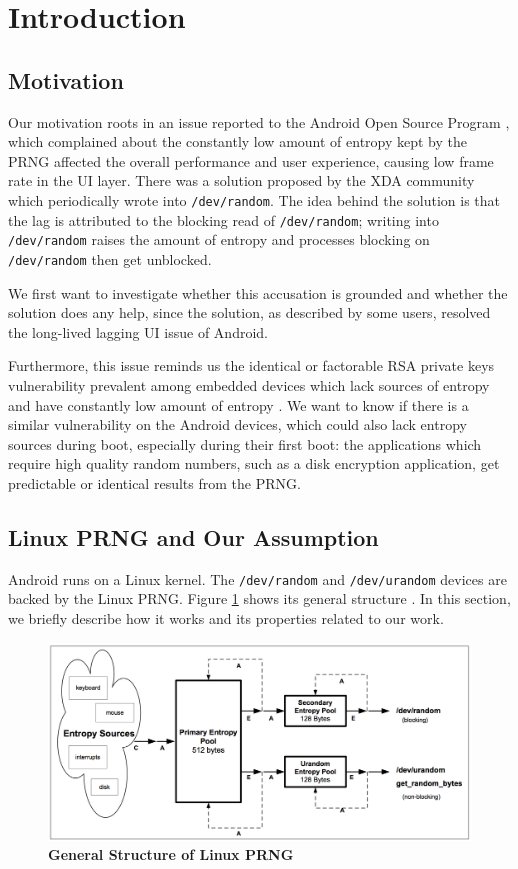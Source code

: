\section{Introduction}
\subsection{Motivation}

Our motivation roots in an issue reported to the Android Open Source Program \cite{issue42265} , which complained about the constantly low amount of entropy kept by the PRNG affected the overall performance and user experience, causing low frame rate in the UI layer. There was a solution proposed by the XDA community which periodically wrote into \verb|/dev/random|. The idea behind the solution is that the lag is attributed to the blocking read of \verb|/dev/random|; writing into \verb|/dev/random| raises the amount of entropy and processes blocking on \verb|/dev/random| then get unblocked. 

We first want to investigate whether this accusation is grounded and whether the solution does any help, since the solution, as described by some users, resolved the long-lived lagging UI issue of Android.

Furthermore, this issue reminds us the identical or factorable RSA private keys vulnerability prevalent among embedded devices which lack sources of entropy and have constantly low amount of entropy \cite{weakkeys12}. We want to know if there is a similar vulnerability on the Android devices, which could also lack entropy sources during boot, especially during their first boot: the applications which require high quality random numbers, such as a disk encryption application,  get predictable or identical results from the PRNG.

\subsection{Linux PRNG and Our Assumption}
Android runs on a Linux kernel. The \verb|/dev/random| and \verb|/dev/urandom| devices are backed by the Linux PRNG. Figure \ref{figprng} shows its general structure \cite{Gutterman06}. In this section, we briefly describe how it works and its properties related to our work.

\begin{figure}[t]
\begin{center}
\includegraphics[scale=0.27]{prng.png}
\end{center}
\caption{{\bf General Structure of Linux PRNG}}
\label{figprng}
\end{figure}


